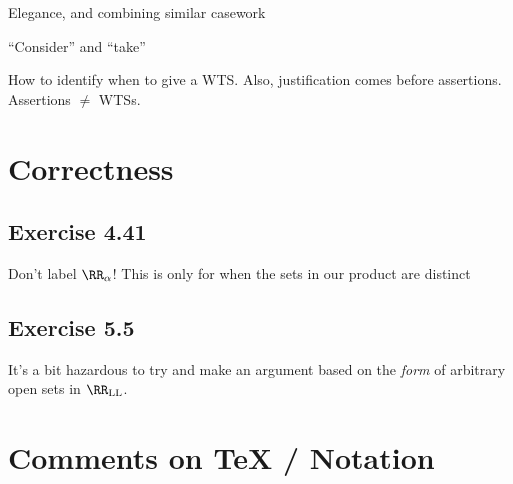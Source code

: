 \documentclass{fkpset}
\begin{document}
\begin{problem}[A2]
  Elegance, and combining similar casework
\end{problem}
\begin{problem}[A3]
  ``Consider'' and ``take''
\end{problem}
\begin{problem}[A4]
  How to identify when to give a WTS. Also, justification comes before
  assertions. Assertions $\neq$ WTSs.
\end{problem}
\section{Correctness}
\subsection{Exercise 4.41}
\begin{problem}[B2]
  Don't label $\RR_\alpha$! This is only for when the sets in our product are
  distinct
\end{problem}
\subsection{Exercise 5.5}
\begin{problem}[B1]
  It's a bit hazardous to try and make an argument based on the \emph{form} of
  arbitrary open sets in $\RR_{\rm LL}$.
\end{problem}
\section{Comments on TeX / Notation}
\end{document}
